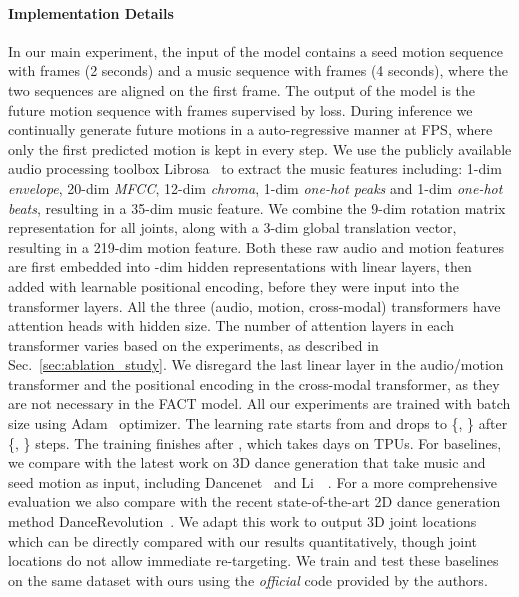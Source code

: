 \vspace{-3mm}
\paragraph{Implementation Details}
In our main experiment, the input of the model contains a seed motion sequence with  frames (2 seconds) and a music sequence with  frames (4 seconds), where the two sequences are aligned on the first frame. The output of the model is the future motion sequence with  frames supervised by  loss.
During inference we continually generate future motions in a auto-regressive manner at  FPS, where only the first predicted motion is kept in every step.
We use the publicly available audio processing toolbox Librosa~\cite{mcfee2015librosa} to extract the music features including: 1-dim \emph{envelope}, 20-dim \emph{MFCC}, 12-dim \emph{chroma}, 1-dim \emph{one-hot peaks} and 1-dim \emph{one-hot beats}, 
resulting in a 35-dim music feature. 
We combine the 9-dim rotation matrix representation for all  joints, along with a 3-dim global translation vector, resulting in a 219-dim motion feature. Both these raw audio and motion features are first embedded into -dim hidden representations with linear layers, then added with learnable positional encoding, before they were input into the transformer layers.
All the three (audio, motion, cross-modal) transformers have  attention heads with  hidden size. The number of attention layers in each transformer varies based on the experiments, as described in Sec.~\ref{sec:ablation_study}. 
We disregard the last linear layer in the audio/motion transformer and the positional encoding in the cross-modal transformer, as they are not necessary in the FACT model.
All our experiments are trained with  batch size using Adam~\cite{kingma2014adam} optimizer. 
The learning rate starts from  and drops to \{, \} after \{, \} steps. The training finishes after , which takes  days on  TPUs. 
For baselines, we compare with the latest work on 3D dance generation that take music and seed motion as input,
including Dancenet~\cite{zhuang2020music2dance} and Li~\etal~\cite{li2020learning}. For a more comprehensive evaluation we also compare with the recent state-of-the-art 2D dance generation method DanceRevolution~\cite{huang2021}. We adapt this work to output 3D joint locations which can be directly compared with our results quantitatively, though joint locations do not allow immediate re-targeting.
We train and test these baselines on the same dataset with ours using the \emph{official} code provided by the authors.


